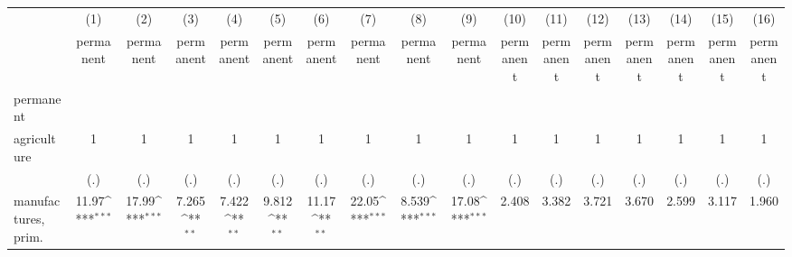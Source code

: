 {
\def\sym#1{\ifmmode^{#1}\else\(^{#1}\)\fi}
\begin{tabular}{l*{16}{c}}
\hline\hline
                    &\multicolumn{1}{c}{(1)}&\multicolumn{1}{c}{(2)}&\multicolumn{1}{c}{(3)}&\multicolumn{1}{c}{(4)}&\multicolumn{1}{c}{(5)}&\multicolumn{1}{c}{(6)}&\multicolumn{1}{c}{(7)}&\multicolumn{1}{c}{(8)}&\multicolumn{1}{c}{(9)}&\multicolumn{1}{c}{(10)}&\multicolumn{1}{c}{(11)}&\multicolumn{1}{c}{(12)}&\multicolumn{1}{c}{(13)}&\multicolumn{1}{c}{(14)}&\multicolumn{1}{c}{(15)}&\multicolumn{1}{c}{(16)}\\
                    &\multicolumn{1}{c}{permanent}&\multicolumn{1}{c}{permanent}&\multicolumn{1}{c}{permanent}&\multicolumn{1}{c}{permanent}&\multicolumn{1}{c}{permanent}&\multicolumn{1}{c}{permanent}&\multicolumn{1}{c}{permanent}&\multicolumn{1}{c}{permanent}&\multicolumn{1}{c}{permanent}&\multicolumn{1}{c}{permanent}&\multicolumn{1}{c}{permanent}&\multicolumn{1}{c}{permanent}&\multicolumn{1}{c}{permanent}&\multicolumn{1}{c}{permanent}&\multicolumn{1}{c}{permanent}&\multicolumn{1}{c}{permanent}\\
\hline
permanent           &                     &                     &                     &                     &                     &                     &                     &                     &                     &                     &                     &                     &                     &                     &                     &                     \\
agriculture         &           1         &           1         &           1         &           1         &           1         &           1         &           1         &           1         &           1         &           1         &           1         &           1         &           1         &           1         &           1         &           1         \\
                    &         (.)         &         (.)         &         (.)         &         (.)         &         (.)         &         (.)         &         (.)         &         (.)         &         (.)         &         (.)         &         (.)         &         (.)         &         (.)         &         (.)         &         (.)         &         (.)         \\
[1em]
manufactures, prim. &       11.97\sym{***}&       17.99\sym{***}&       7.265\sym{**} &       7.422\sym{**} &       9.812\sym{**} &       11.17\sym{**} &       22.05\sym{***}&       8.539\sym{***}&       17.08\sym{***}&       2.408         &       3.382         &       3.721         &       3.670         &       2.599         &       3.117         &       1.960         \\

\end{tabular}}
